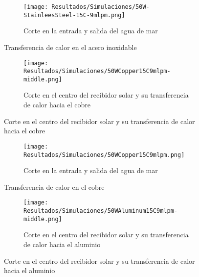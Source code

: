 				\begin{figure}[H]\ContinuedFloat
					\begin{subfigure}[t]{\linewidth}
						\centering
						\texttt{[image: Resultados/Simulaciones/50W-StainleesSteel-15C-9mlpm.png]}
						\caption{Corte en la entrada y salida del agua de mar}
						\label{fig:50W-StainleesSteel-15C-9mlpm}
					\end{subfigure}
					\hfill
					\caption{Transferencia de calor en el acero inoxidable}
					\label{fig:stainless-steel-heat-transfer}
				\end{figure}
				
				\begin{figure}[H]
					\centering
					\begin{subfigure}[t]{\linewidth}
						\centering
						\texttt{[image: Resultados/Simulaciones/50WCopper15C9mlpm-middle.png]}
						\caption{Corte en el centro del recibidor solar y su transferencia de calor hacia el cobre}
						\label{fig:50WCopper15C9mlpm-middle}
					\end{subfigure}
				\end{figure}

				\begin{figure}[H]\ContinuedFloat
					\begin{subfigure}[t]{\linewidth}
						\centering
						\texttt{[image: Resultados/Simulaciones/50WCopper15C9mlpm.png]}
						\caption{Corte en la entrada y salida del agua de mar}
						\label{fig:50WCopper15C9mlpm}
					\end{subfigure}
					\hfill
					\caption{Transferencia de calor en el cobre}
					\label{fig:copper-heat-transfer}
				\end{figure}
				
				\begin{figure}[H]
					\centering
					\begin{subfigure}[t]{\linewidth}
						\centering
						\texttt{[image: Resultados/Simulaciones/50WAluminum15C9mlpm-middle.png]}
						\caption{Corte en el centro del recibidor solar y su transferencia de calor hacia el aluminio}
						\label{fig:50WAluminum15C9mlpm-middle}
					\end{subfigure}
				\end{figure}

